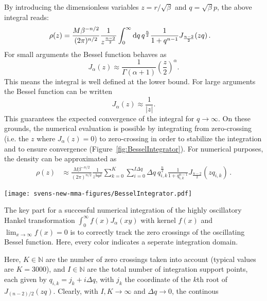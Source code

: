 By introducing the dimensionless variables $z=r/\sqrt{\beta}$ and $q=\sqrt{\beta}p$, the above integral reads:
\begin{align}
\rho(z) 
&= \frac{M \beta^{-n/2}}{(2\pi)^{n/2}} \frac{1}{z^{\frac{n-2}{2}}} 
\int_0^\infty 
\mathrm{d} q\, 
q^{\frac{n}{2}}
\frac{1}{1+q^{n-1}} J_{\frac{n-2}{2}}(zq) \,.
\label{eq:rho-ndim-integral}
\end{align}
For small arguments the Bessel function behaves as
\begin{equation}
J_{\alpha }(z)\approx {\frac {1}{\Gamma (\alpha +1)}}\left({\frac {z}{2}}\right)^{\alpha }.
\end{equation} 
This means the integral is well defined at the lower bound.
For large arguments the Bessel function can be written
\begin{equation}
J_{\alpha }(z)\approx \frac{1}{|z|}.
\end{equation} 
This guarantees the expected convergence of the integral for $q\to\infty$.
On these grounds, the numerical evaluation is possible by integrating from
zero-crossing (i.e. the $z$ where $J_\alpha(z)=0$) to zero-crossing in order
to stabilize the integration and to ensure convergence
(Figure~\ref{fig:BesselIntegrator}). For numerical
purposes, the density can be approximated as
\begin{align}
\rho(z) 
&\approx \frac{M \beta^{-n/2}}{(2\pi)^{n/2}} \frac{1}{z^{\frac{n-2}{2}}} 
\sum_{k=0}^K
\sum_{i=0}^{I\Delta q}
\Delta q~
q_{i,k}^{\frac{n}{2}}
\frac{1}{1+q_{i,k}^{n-1}} J_{\frac{n-2}{2}}(zq_{i,k})
\,.
\label{eq:rho-ndim-integral-discrete}
\end{align}
%
\begin{marginfigure}
	\texttt{[image: svens-new-mma-figures/BesselIntegrator.pdf]}
	\caption[Besselintegrator, with Mathematica, \exclusive]{
		The key part for a successful numerical integration of the highly oscillatory
		Hankel transformation $\int_0^\infty f(x) J_\alpha(xy)$
		with kernel $f(x)$ and $\lim_{x\to \infty} f(x)=0$
		is to correctly track the zero crossings of the oscillating Bessel function.
		Here, every color indicates a seperate integration domain.
	}\label{fig:BesselIntegrator}
\end{marginfigure}%
%
Here, $K\in \mathbb{N}$ are the number of zero crossings taken into account
(typical values are $K=3000$),
and $I\in \mathbb{N}$ are the total number of integration support points, each given by 
$q_{i,k}=j_k + i\Delta q$, with $j_k$ the coordinate of the $k$th root of
$J_{(n-2)/2}(zq)$.
Clearly, with $I,K\to\infty$ and $\Delta q\to 0$, the continous
